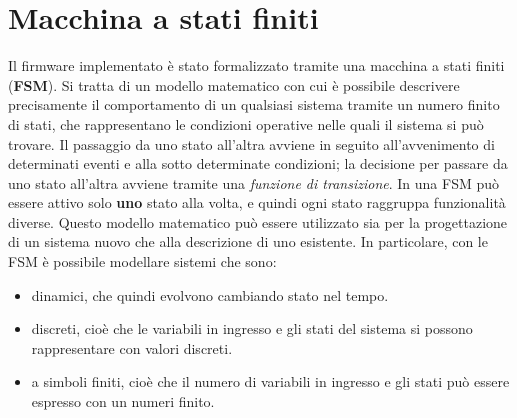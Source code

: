 \section{Macchina a stati finiti}
Il firmware implementato è stato formalizzato tramite una macchina a stati finiti (\textbf{FSM}). Si tratta di un modello matematico con cui è possibile descrivere precisamente il comportamento di un qualsiasi sistema tramite un numero finito di stati, che rappresentano le condizioni operative nelle quali il sistema si può trovare. Il passaggio da uno stato all'altra avviene in seguito all'avvenimento di determinati eventi e alla sotto determinate condizioni; la decisione per passare da uno stato all'altra avviene tramite una \textit{funzione di transizione}. In una FSM può essere attivo solo \textbf{uno} stato alla volta, e quindi ogni stato raggruppa funzionalità diverse.
Questo modello matematico può essere utilizzato sia per la progettazione di un sistema nuovo che alla descrizione di uno esistente. In particolare, con le FSM è possibile modellare sistemi che sono:
\begin{itemize}
	\item dinamici, che quindi evolvono cambiando stato nel tempo.
	\item discreti, cioè che le variabili in ingresso e gli stati del sistema si possono rappresentare con valori discreti.
	\item a simboli finiti, cioè che il numero di variabili in ingresso e gli stati può essere espresso con un numeri finito.
\end{itemize}
\clearpage